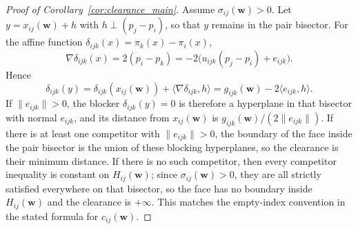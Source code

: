 \documentclass[preprint,12pt]{elsarticle}
\newcommand{\weights}{\mathbf{w}}
\begin{document}
\begin{proof}[Proof of Corollary~\ref{cor:clearance_main}]
Assume $\sigma_{ij}(\weights)>0$. Let $y=x_{ij}(\weights)+h$ with
$h\perp (p_j-p_i)$, so that $y$ remains in the pair bisector. For the affine
function $\delta_{ijk}(x)=\pi_k(x)-\pi_i(x)$,
\begin{equation}
    \nabla \delta_{ijk}(x)=2(p_i-p_k)=-2\bigl(u_{ijk}(p_j-p_i)+e_{ijk}\bigr).
\end{equation}
Hence
\begin{equation}
    \delta_{ijk}(y)=\delta_{ijk}(x_{ij}(\weights))+
    \langle \nabla\delta_{ijk},h\rangle
    =g_{ijk}(\weights)-2\langle e_{ijk},h\rangle.
\end{equation}
If $\|e_{ijk}\|>0$, the blocker $\delta_{ijk}(y)=0$ is therefore a hyperplane in
that bisector with normal $e_{ijk}$, and its distance from $x_{ij}(\weights)$
is $g_{ijk}(\weights)/(2\|e_{ijk}\|)$. If there is at least one competitor with
$\|e_{ijk}\|>0$, the boundary of the face inside the pair bisector is the union
of these blocking hyperplanes, so the clearance is their minimum distance. If
there is no such competitor, then every competitor inequality is constant on
$H_{ij}(\weights)$; since $\sigma_{ij}(\weights)>0$, they are all strictly
satisfied everywhere on that bisector, so the face has no boundary inside
$H_{ij}(\weights)$ and the clearance is $+\infty$. This matches the empty-index
convention in the stated formula for $c_{ij}(\weights)$.
\end{proof}
\end{document}
